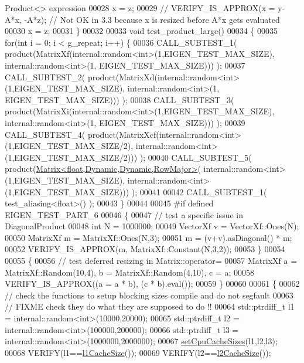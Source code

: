 \begin{DoxyCode}
{       Product<> expression}
00028   x = z;
00029   \textcolor{comment}{// VERIFY\_IS\_APPROX(x = y-A*x, -A*z);   // Not OK in 3.3 because x is resized before A*x gets evaluated}
00030   x = z;
00031 \}
00032 
00033 \textcolor{keywordtype}{void} test\_product\_large()
00034 \{
00035   \textcolor{keywordflow}{for}(\textcolor{keywordtype}{int} i = 0; i < g\_repeat; i++) \{
00036     CALL\_SUBTEST\_1( product(MatrixXf(internal::random<int>(1,EIGEN\_TEST\_MAX\_SIZE), internal::random<int>(1,
      EIGEN\_TEST\_MAX\_SIZE))) );
00037     CALL\_SUBTEST\_2( product(MatrixXd(internal::random<int>(1,EIGEN\_TEST\_MAX\_SIZE), internal::random<int>(1,
      EIGEN\_TEST\_MAX\_SIZE))) );
00038     CALL\_SUBTEST\_3( product(MatrixXi(internal::random<int>(1,EIGEN\_TEST\_MAX\_SIZE), internal::random<int>(1,
      EIGEN\_TEST\_MAX\_SIZE))) );
00039     CALL\_SUBTEST\_4( product(MatrixXcf(internal::random<int>(1,EIGEN\_TEST\_MAX\_SIZE/2), internal::random<int>
      (1,EIGEN\_TEST\_MAX\_SIZE/2))) );
00040     CALL\_SUBTEST\_5( product(\hyperlink{group___core___module_class_eigen_1_1_matrix}{Matrix<float,Dynamic,Dynamic,RowMajor>}(
      internal::random<int>(1,EIGEN\_TEST\_MAX\_SIZE), internal::random<int>(1,EIGEN\_TEST\_MAX\_SIZE))) );
00041 
00042     CALL\_SUBTEST\_1( test\_aliasing<float>() );
00043   \}
00044 
00045 \textcolor{preprocessor}{#if defined EIGEN\_TEST\_PART\_6}
00046   \{
00047     \textcolor{comment}{// test a specific issue in DiagonalProduct}
00048     \textcolor{keywordtype}{int} N = 1000000;
00049     VectorXf v = VectorXf::Ones(N);
00050     MatrixXf m = MatrixXf::Ones(N,3);
00051     m = (v+v).asDiagonal() * m;
00052     VERIFY\_IS\_APPROX(m, MatrixXf::Constant(N,3,2));
00053   \}
00054 
00055   \{
00056     \textcolor{comment}{// test deferred resizing in Matrix::operator=}
00057     MatrixXf a = MatrixXf::Random(10,4), b = MatrixXf::Random(4,10), c = a;
00058     VERIFY\_IS\_APPROX((a = a * b), (c * b).eval());
00059   \}
00060 
00061   \{
00062     \textcolor{comment}{// check the functions to setup blocking sizes compile and do not segfault}
00063     \textcolor{comment}{// FIXME check they do what they are supposed to do !!}
00064     std::ptrdiff\_t l1 = internal::random<int>(10000,20000);
00065     std::ptrdiff\_t l2 = internal::random<int>(100000,200000);
00066     std::ptrdiff\_t l3 = internal::random<int>(1000000,2000000);
00067     \hyperlink{namespace_eigen_ae64421554aa0a4bf9258bafe3170102b}{setCpuCacheSizes}(l1,l2,l3);
00068     VERIFY(l1==\hyperlink{namespace_eigen_a2669f89ff38296a38e6d973552eb4e33}{l1CacheSize}());
00069     VERIFY(l2==\hyperlink{namespace_eigen_a2cfc0330ba567d63a496be1cac8427ae}{l2CacheSize}());

\end{DoxyCode}
